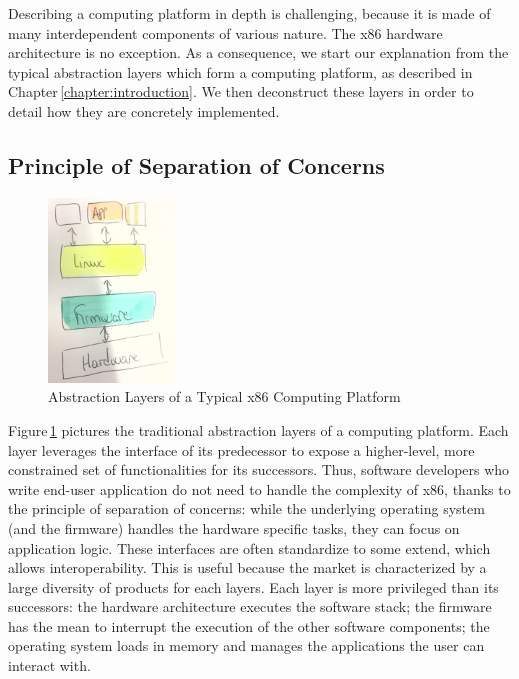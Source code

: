 Describing a computing platform in depth is challenging, because it is made of
many interdependent components of various nature.
%
The x86 hardware architecture is no exception.
%
As a consequence, we start our explanation from the typical abstraction layers
which form a computing platform, as described in
Chapter\,\ref{chapter:introduction}.
%
We then deconstruct these layers in order to detail how they are concretely
implemented.

\subsection{Principle of Separation of Concerns}

\begin{figure}
  \centering
  \includegraphics[width=0.3\textwidth]{Figures/computing-platform-1.jpg}
  \caption{Abstraction Layers of a Typical x86 Computing Platform}
  \label{fig:usecase:computing-platform-1}
\end{figure}

Figure\,\ref{fig:usecase:computing-platform-1} pictures the traditional
abstraction layers of a computing platform.
%
Each layer leverages the interface of its predecessor to expose a higher-level,
more constrained set of functionalities for its successors.
%
Thus, software developers who write end-user application do not need to handle
the complexity of x86, thanks to the principle of separation of concerns: while
the underlying operating system (and the firmware) handles the hardware specific
tasks, they can focus on application logic.
%
These interfaces are often standardize to some extend, which allows
interoperability.
%
This is useful because the market is characterized by a large diversity of
products for each layers.
%
Each layer is more privileged than its successors:
%
the hardware architecture executes the software stack;
%
the firmware has the mean to interrupt the execution of the other software
components;
%
the operating system loads in memory and manages the applications the user can
interact with.

